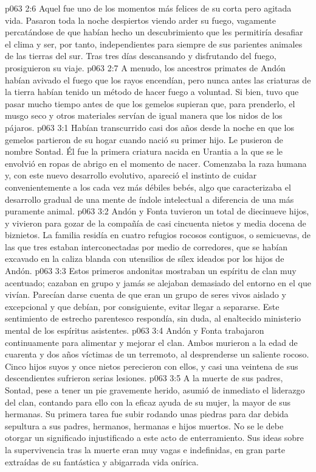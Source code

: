 \vs p063 2:6 Aquel fue uno de los momentos más felices de su corta pero agitada vida. Pasaron toda la noche despiertos viendo arder su fuego, vagamente percatándose de que habían hecho un descubrimiento que les permitiría desafiar el clima y ser, por tanto, independientes para siempre de sus parientes animales de las tierras del sur. Tras tres días descansando y disfrutando del fuego, prosiguieron su viaje.
\vs p063 2:7 A menudo, los ancestros primates de Andón habían avivado el fuego que los rayos encendían, pero nunca antes las criaturas de la tierra habían tenido un método de hacer fuego a voluntad. Si bien, tuvo que pasar mucho tiempo antes de que los gemelos supieran que, para prenderlo, el musgo seco y otros materiales servían de igual manera que los nidos de los pájaros.
\vs p063 3:1 Habían transcurrido casi dos años desde la noche en que los gemelos partieron de su hogar cuando nació su primer hijo. Le pusieron de nombre Sontad. Él fue la primera criatura nacida en Urantia a la que se le envolvió en ropas de abrigo en el momento de nacer. Comenzaba la raza humana y, con este nuevo desarrollo evolutivo, apareció el instinto de cuidar convenientemente a los cada vez más débiles bebés, algo que caracterizaba el desarrollo gradual de una mente de índole intelectual a diferencia de una más puramente animal.
\vs p063 3:2 Andón y Fonta tuvieron un total de diecinueve hijos, y vivieron para gozar de la compañía de casi cincuenta nietos y media docena de biznietos. La familia residía en cuatro refugios rocosos contiguos, o semicuevas, de las que tres estaban interconectadas por medio de corredores, que se habían excavado en la caliza blanda con utensilios de sílex ideados por los hijos de Andón.
\vs p063 3:3 Estos primeros andonitas mostraban un espíritu de clan muy acentuado; cazaban en grupo y jamás se alejaban demasiado del entorno en el que vivían. Parecían darse cuenta de que eran un grupo de seres vivos aislado y excepcional y que debían, por consiguiente, evitar llegar a separarse. Este sentimiento de estrecho parentesco respondía, sin duda, al enaltecido ministerio mental de los espíritus asistentes.
\vs p063 3:4 \pc Andón y Fonta trabajaron continuamente para alimentar y mejorar el clan. Ambos murieron a la edad de cuarenta y dos años víctimas de un terremoto, al desprenderse un saliente rocoso. Cinco hijos suyos y once nietos perecieron con ellos, y casi una veintena de sus descendientes sufrieron serias lesiones.
\vs p063 3:5 A la muerte de sus padres, Sontad, pese a tener un pie gravemente herido, asumió de inmediato el liderazgo del clan, contando para ello con la eficaz ayuda de su mujer, la mayor de sus hermanas. Su primera tarea fue subir rodando unas piedras para dar debida sepultura a sus padres, hermanos, hermanas e hijos muertos. No se le debe otorgar un significado injustificado a este acto de enterramiento. Sus ideas sobre la supervivencia tras la muerte eran muy vagas e indefinidas, en gran parte extraídas de su fantástica y abigarrada vida onírica.
